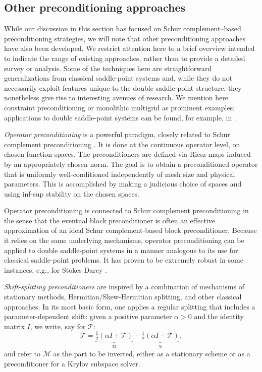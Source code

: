 \documentclass{article}
\newcommand{\sT}{\mathcal{T}}
\begin{document}
\subsection{Other preconditioning approaches}
\label{sec:prec_other}

While our discussion in this section has focused on Schur complement–based preconditioning strategies, we will note that other preconditioning approaches have also been developed. We restrict attention here to a brief overview intended to indicate the range of existing approaches, rather than to provide a detailed survey or analysis. Some of the techniques here are straightforward generalizations from  classical saddle-point systems and, while they do not necessarily exploit features unique to the double saddle-point structure, they nonetheless give rise to interesting avenues of research. We mention here constraint preconditioning or monolithic multigrid as prominent examples; applications to double saddle-point systems can be found, for example, in \cite{abcfmt21,ch24,rg13}.

{\em Operator preconditioning} is a powerful paradigm, closely related to Schur complement preconditioning \cite{MardalWinther2011}. It is done at the continuous operator level, on chosen function spaces. The preconditioners are defined via Riesz maps induced by an appropriately chosen norm. The goal is to obtain a preconditioned operator that is uniformly well-conditioned independently of mesh size and physical parameters. This is accomplished by making a judicious choice of spaces and using inf-sup stability on the chosen spaces.

Operator preconditioning is connected to Schur complement preconditioning in the sense that the eventual block preconditioner is often an effective approximation of an ideal Schur complement-based block preconditioner. Because it relies on the same underlying mechanisms, operator preconditioning can be applied to double saddle-point systems in a manner analogous to its use for classical saddle-point problems. It has proven to be extremely robust in some instances, e.g., for Stokes-Darcy \cite{hkm21}. 


{\em Shift-splitting  preconditioners}
are inspired by a combination of mechanisms of stationary methods, Hermitian/Skew-Hermitian splitting, and other classical approaches. In its most basic form, one applies a regular splitting that includes a parameter-dependent shift:
given a positive parameter $\alpha > 0$ and the identity matrix $I$, we write, say for $\sT$:
\begin{equation*}
\sT = \underbrace{\tfrac{1}{2}(\alpha I + \sT)}_{\mathcal{M}} - \underbrace{\tfrac{1}{2}(\alpha I - \sT)}_{\mathcal N},
\end{equation*}
and refer to $\mathcal{M}$ as the part to be inverted, either as a stationary scheme or as a preconditioner for a Krylov subspace solver.
\end{document}
